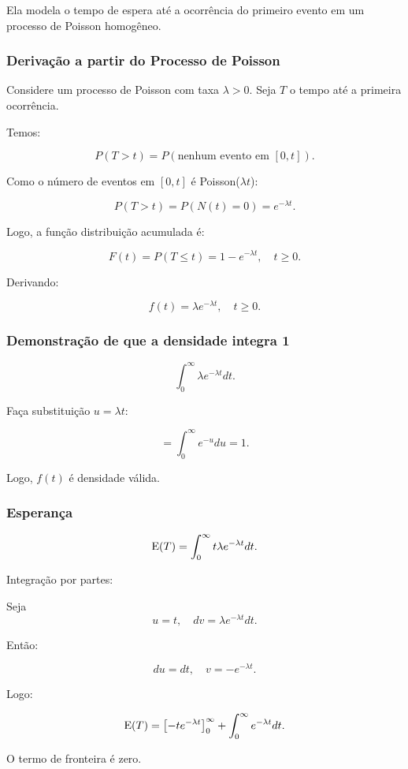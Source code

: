 Ela modela o tempo de espera até a ocorrência do primeiro evento
em um processo de Poisson homogêneo.

\subsubsection{Derivação a partir do Processo de Poisson}

Considere um processo de Poisson com taxa $\lambda>0$.
Seja $T$ o tempo até a primeira ocorrência.

Temos:

\[
P(T>t)=P(\text{nenhum evento em }[0,t]).
\]

Como o número de eventos em $[0,t]$ é Poisson($\lambda t$):

\[
P(T>t)=P(N(t)=0)
=
e^{-\lambda t}.
\]

Logo, a função distribuição acumulada é:

\[
F(t)
=
P(T\le t)
=
1-e^{-\lambda t}, \quad t\ge 0.
\]

Derivando:

\[
f(t)
=
\lambda e^{-\lambda t}, \quad t\ge 0.
\]

\subsubsection{Demonstração de que a densidade integra 1}

\[
\int_0^\infty \lambda e^{-\lambda t} dt.
\]

Faça substituição $u=\lambda t$:

\[
=
\int_0^\infty e^{-u} du
=
1.
\]

Logo, $f(t)$ é densidade válida.

\subsubsection{Esperança}

\[
\operatorname{E}(T)
=
\int_0^\infty
t \lambda e^{-\lambda t} dt.
\]

Integração por partes:

Seja
\[
u=t,
\quad
dv=\lambda e^{-\lambda t}dt.
\]

Então:

\[
du=dt,
\quad
v=-e^{-\lambda t}.
\]

Logo:

\[
\operatorname{E}(T)
=
\left[
- t e^{-\lambda t}
\right]_0^\infty
+
\int_0^\infty
e^{-\lambda t} dt.
\]

O termo de fronteira é zero.

